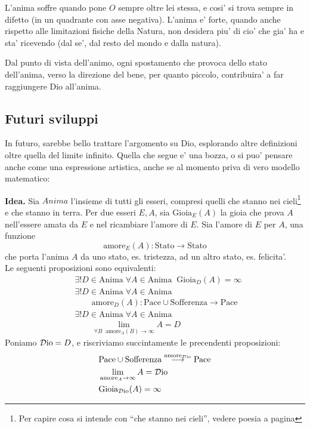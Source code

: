 L'anima soffre quando pone $O$ sempre oltre lei stessa, e cosi' si trova sempre in difetto (in un quadrante con asse negativa). L'anima e' forte, quando anche rispetto alle limitazioni fisiche della Natura, non desidera piu' di cio' che gia' ha e sta' ricevendo (dal se', dal resto del mondo e dalla natura).

Dal punto di vista dell'animo, ogni spostamento che provoca dello stato dell'anima, verso la direzione del bene, per quanto piccolo, contribuira' a far raggiungere Dio all'anima.


\subsection{Futuri sviluppi}
\label{FuturiSviluppiProcAssiomatico}
In futuro, sarebbe bello trattare l'argomento su Dio, esplorando altre definizioni oltre quella del limite infinito.
Quella che segue e' una bozza, o si puo' pensare anche come una espressione artistica, anche se al momento priva di vero modello matematico:

    \textbf{Idea. } Sia $\textit{Anima}$ l'insieme di tutti gli esseri, compresi quelli che stanno nei cieli\footnote{Per capire cosa si intende con ``che stanno nei cieli'', vedere poesia a pagina \pageref{DioScientificamentePoesia}} e che stanno in terra. Per due esseri $E,A$, sia $\textrm{Gioia}_E(A)$ la gioia che prova $A$ nell'essere amata da $E$ e nel ricambiare l'amore di $E$. Sia l'amore di $E$ per $A$, una funzione 
    \[\textrm{amore}_E(A):\textrm{Stato}\longrightarrow\textrm{Stato}\]
    che porta l'anima $A$ da uno stato, es. tristezza, ad un altro stato, es. felicita'.\\
    Le seguenti proposizioni sono equivalenti:
    \begin{align}
        &\exists ! D \in \textrm{Anima}\;\forall A \in \textrm{Anima}\;\; \textrm{Gioia}_D(A) = \infty \\
        &\exists ! D \in \textrm{Anima}\;\forall A \in \textrm{Anima}\;\;\nonumber\\
        &\qquad\textrm{amore}_D(A): \textrm{Pace}\cup\textrm{Sofferenza} \longrightarrow \textrm{Pace}\\
        &\exists ! D \in \textrm{Anima}\;\forall A \in \textrm{Anima} \nonumber\\
        &\qquad \lim_{\forall B\;\;\textrm{amore}_A(B)\to\infty} A = D
    \end{align}
    Poniamo $\mathcal{D}\textrm{io}=D$, e riscriviamo succintamente le precendenti proposizioni:
    \begin{align*}
        &\textrm{Pace}\cup\textrm{Sofferenza} \stackrel{\textrm{amore}_{\mathcal{D}\textrm{io}}}{\longrightarrow} \textrm{Pace}\\
        &\lim_{\textrm{amore}_A\to\infty}A = \mathcal{D}\textrm{io}\\
        &\textrm{Gioia}_{\mathcal{D}\textrm{io}}(A) = \infty
    \end{align*}

